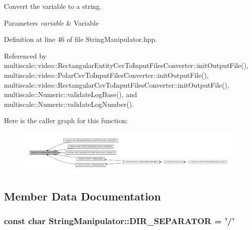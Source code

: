 \-Convert the variable to a string. 


\begin{DoxyParams}{\-Parameters}
{\em variable} & \-Variable \\
\hline
\end{DoxyParams}


\-Definition at line 46 of file \-String\-Manipulator.\-hpp.



\-Referenced by multiscale\-::video\-::\-Rectangular\-Entity\-Csv\-To\-Input\-Files\-Converter\-::init\-Output\-File(), multiscale\-::video\-::\-Polar\-Csv\-To\-Input\-Files\-Converter\-::init\-Output\-File(), multiscale\-::video\-::\-Rectangular\-Csv\-To\-Input\-Files\-Converter\-::init\-Output\-File(), multiscale\-::\-Numeric\-::validate\-Log\-Base(), and multiscale\-::\-Numeric\-::validate\-Log\-Number().



\-Here is the caller graph for this function\-:\nopagebreak
\begin{figure}[H]
\begin{center}
\leavevmode
\includegraphics[width=350pt]{classmultiscale_1_1StringManipulator_a91858c4faa5ee210a9b67e4885835368_icgraph}
\end{center}
\end{figure}




\subsection{\-Member \-Data \-Documentation}
\hypertarget{classmultiscale_1_1StringManipulator_a3c975968005d8db010415d240b02b5db}{
\subsubsection[{\-D\-I\-R\-\_\-\-S\-E\-P\-A\-R\-A\-T\-O\-R}]{\setlength{\rightskip}{0pt plus 5cm}const char {\bf \-String\-Manipulator\-::\-D\-I\-R\-\_\-\-S\-E\-P\-A\-R\-A\-T\-O\-R} = '/'}}\label{classmultiscale_1_1StringManipulator_a3c975968005d8db010415d240b02b5db}


